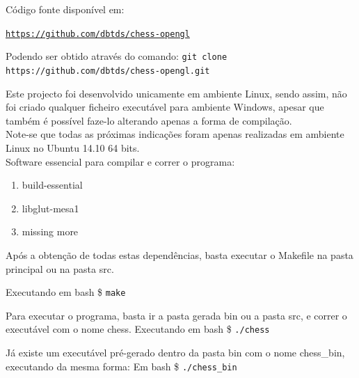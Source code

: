 \documentclass[portugues,final]{revdetua}
\begin{document}
Código fonte disponível em:

{\tt \url{https://github.com/dbtds/chess-opengl}}

Podendo ser obtido através do comando: {\tt git clone https://github.com/dbtds/chess-opengl.git}

Este projecto foi desenvolvido unicamente em ambiente Linux, sendo assim, não foi criado qualquer ficheiro executável para ambiente Windows, apesar que também é possível faze-lo alterando apenas a forma de compilação.\\

Note-se que todas as próximas indicações foram apenas realizadas em ambiente Linux no Ubuntu 14.10 64 bits.\\

Software essencial para compilar e correr o programa:
\begin{enumerate}
\item build-essential
\item libglut-mesa1
\item missing more
\end{enumerate}

Após a obtenção de todas estas dependências, basta executar o Makefile na pasta principal ou na pasta src.

Executando em bash \$ {\tt make}

Para executar o programa, basta ir a pasta gerada bin ou a pasta src, e correr o executável com o nome chess.
Executando em bash \$ {\tt ./chess}

Já existe um executável pré-gerado dentro da pasta bin com o nome chess\_bin, executando da mesma forma:
Em bash \$ {\tt ./chess\_bin}


\end{document}
